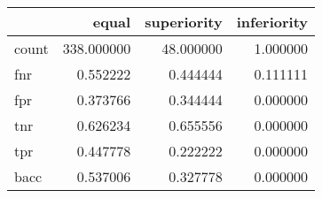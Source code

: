 \begin{tabular}{lrrr}
\toprule
{} &       equal &  superiority &  inferiority \\
\midrule
count &  338.000000 &    48.000000 &     1.000000 \\
fnr   &    0.552222 &     0.444444 &     0.111111 \\
fpr   &    0.373766 &     0.344444 &     0.000000 \\
tnr   &    0.626234 &     0.655556 &     0.000000 \\
tpr   &    0.447778 &     0.222222 &     0.000000 \\
bacc  &    0.537006 &     0.327778 &     0.000000 \\
\bottomrule
\end{tabular}
